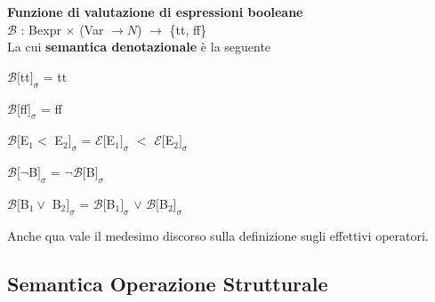 \documentclass[10pt]{book}
\begin{document}
\begin{list}{}{Inoltre, per valutare le espressioni generate dalla grammatica, servono delle \textbf{funzioni di valutazione}. Esse \textbf{trovano il significato di ogni espressione}}
	\pagebreak
	\item \textbf{Funzione di valutazione di espressioni booleane}\\$\mathscr{B}$ : Bexpr $\times$ (Var $\rightarrow N$) $\rightarrow$ \{tt, ff\}\\
	La cui \textbf{semantica denotazionale} è la seguente
	\begin{multicols}{2}
	\begin{list}{}{}
		\item $\mathscr{B}[$tt$]_\sigma$ = tt
		\item $\mathscr{B}[$ff$]_\sigma$ = ff
		\item $\mathscr{B}[$E$_1 <$ E$_2]_\sigma$ = $\mathscr{E}[$E$_1]_\sigma$ $<$ $\mathscr{E}[$E$_2]_\sigma$
		\item $\mathscr{B}[\neg$B$]_\sigma$ = $\neg\mathscr{B}[$B$]_\sigma$
		\item $\mathscr{B}[$B$_1 \vee$ B$_2]_\sigma$ = $\mathscr{B}[$B$_1]_\sigma$ $\vee$ $\mathscr{B}[$B$_2]_\sigma$
	\end{list}
	\end{multicols}
	Anche qua vale il medesimo discorso sulla definizione sugli effettivi operatori.
\end{list}
\subsection{Semantica Operazione Strutturale}
\end{document}
